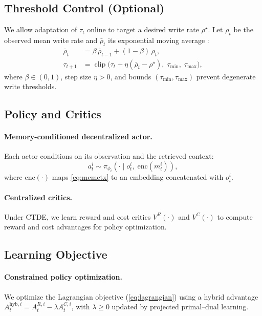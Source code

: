 \documentclass{article}
\theoremstyle{plain}
\theoremstyle{definition}
\theoremstyle{remark}
\begin{document}
\subsection{Threshold Control (Optional)}
\label{sec:adaptive-threshold}
We allow adaptation of $\tau_t$ online to target a desired write rate $\rho^\star$. Let $\rho_t$ be the observed mean write rate and $\bar{\rho}_t$ its exponential moving average \cite{stooke2020responsive}:
\begin{align}
\bar{\rho}_t &= \beta\,\bar{\rho}_{t-1} + (1-\beta)\,\rho_t, \label{eq:ema}\\
\tau_{t+1} &=
\operatorname{clip}\!\Big(\tau_t + \eta(\bar{\rho}_t-\rho^\star),\; \tau_{\min},\; \tau_{\max}\Big),
\label{eq:thr-update}
\end{align}
where $\beta\in(0,1)$, step size $\eta>0$, and bounds $(\tau_{\min},\tau_{\max})$ prevent degenerate write thresholds.

\subsection{Policy and Critics}
\label{sec:policy-critics}

\paragraph{Memory-conditioned decentralized actor.}
Each actor conditions on its observation and the retrieved context:
\begin{equation}
a_t^i \sim \pi_{\phi_i}\!\left(\cdot \mid o_t^i,\; \mathrm{enc}(m_t^i)\right),
\label{eq:actor}
\end{equation}
where $\mathrm{enc}(\cdot)$ maps \cref{eq:memctx} to an embedding concatenated with $o_t^i$.

\paragraph{Centralized critics.}
Under CTDE, we learn reward and cost critics $V^R(\cdot)$ and $V^C(\cdot)$ to compute reward and cost advantages for policy optimization.

\subsection{Learning Objective}
\label{sec:objective}

\paragraph{Constrained policy optimization.}
We optimize the Lagrangian objective (\cref{eq:lagrangian}) using a hybrid advantage
$A_t^{\text{hyb},i} = A_t^{R,i} - \lambda A_t^{C,i}$,
with $\lambda\ge 0$ updated by projected primal--dual learning.
\end{document}
